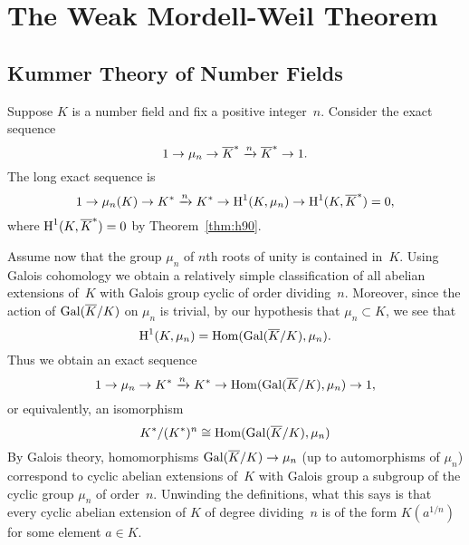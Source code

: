 \chapter{The Weak Mordell-Weil Theorem}\label{ch:weakmw}

\section{Kummer Theory of Number Fields}\label{sec:kummernf}

Suppose $K$ is a number field and fix a positive integer~$n$.
Consider the exact sequence
$$
	1 \to \mu_n \to \overline{K}^* \xrightarrow{n} \overline{K}^* \to 1.
$$
The long exact sequence is
$$
	1 \to \mu_n(K) \to K^* \xrightarrow{n} K^* \to \operatorname{H}^1(K,\mu_n) \to \operatorname{H}^1(K,\overline{K}^*) =0,
$$
where $\operatorname{H}^1(K,\overline{K}^*)=0$ by Theorem~\ref{thm:h90}.

Assume now that the group $\mu_n$ of $n$th roots of unity is
contained in~$K$. Using Galois cohomology we obtain a relatively
simple classification of all abelian extensions of~$K$ with
Galois group cyclic of order dividing~$n$.  Moreover, since the
action of $\operatorname{Gal}(\overline{K}/K)$ on $\mu_n$ is trivial, by our hypothesis
that $\mu_n\subset K$, we see that
$$
	\operatorname{H}^1(K,\mu_n) = \operatorname{Hom}(\operatorname{Gal}(\overline{K}/K),\mu_n).
$$
Thus we obtain an exact sequence
$$
	1 \to \mu_n \to K^* \xrightarrow{n} K^* \to \operatorname{Hom}(\operatorname{Gal}(\overline{K}/K),\mu_n) \to 1,
$$
or equivalently, an isomorphism
$$
	K^*/(K^*)^n \cong \operatorname{Hom}(\operatorname{Gal}(\overline{K}/K),\mu_n)
$$
By Galois theory, homomorphisms $\operatorname{Gal}(\overline{K}/K)\to \mu_n$ (up to
automorphisms of $\mu_n$) correspond to cyclic abelian extensions
of~$K$ with Galois group a subgroup of the cyclic group $\mu_n$ of
order~$n$.  Unwinding the definitions, what this says is that every
cyclic abelian extension of $K$ of degree dividing~$n$ is of the form
$K(a^{1/n})$ for some element $a\in K$.

